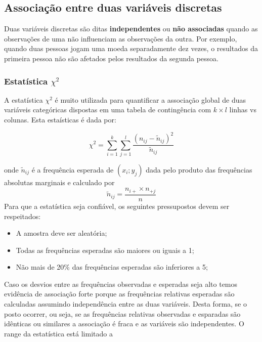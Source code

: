 \documentclass[11pt,]{style/krantz}
\providecommand{\tightlist}{%
  \setlength{\itemsep}{0pt}\setlength{\parskip}{0pt}}
\theoremstyle{definition}
\theoremstyle{definition}
\theoremstyle{definition}
\theoremstyle{remark}
\begin{document}
\hypertarget{associacao-entre-duas-variaveis-discretas}{%
\subsection{Associação entre duas variáveis discretas}\label{associacao-entre-duas-variaveis-discretas}}

Duas variáveis discretas são ditas \textbf{independentes} ou \textbf{não associadas} quando as observações de uma não influenciam as observações da outra. Por exemplo, quando duas pessoas jogam uma moeda separadamente dez vezes, o resultados da primeira pessoa não são afetados pelos resultados da segunda pessoa.

\hypertarget{estatistica-chi2}{%
\subsubsection{\texorpdfstring{Estatística \(\chi^2\)}{Estatística \textbackslash{}chi\^{}2}}\label{estatistica-chi2}}

A estatística \(\chi^2\) é muito utilizada para quantificar a associação global de duas variáveis categóricas dispostas em uma tabela de contingência com \(k \times l\) linhas vs colunas. Esta estaísticas é dada por:

\[\chi^2 = \sum_{i=1}^{k} \sum_{j=1}^{l} \frac{(n_{ij} - \widetilde{n}_{ij})^2}{\widetilde{n}_{ij}}\]

onde \(\widetilde{n}_{ij}\) é a frequência esperada de \((x_i;y_j)\) dada pelo produto das frequências absolutas marginais e calculado por
\[\widetilde{n}_{ij} = \frac{n_{i+}\times n_{+j}}{n}\]
Para que a estatística seja confiável, os seguintes pressupostos devem ser respeitados:

\begin{itemize}
\tightlist
\item
  A amostra deve ser aleatória;
\item
  Todas as frequências esperadas são maiores ou iguais a 1;
\item
  Não mais de 20\% das frequências esperadas são inferiores a 5;
\end{itemize}

Caso os desvios entre as frequências observadas e esperadas seja alto temos evidência de associação forte porque as frequências relativas esperadas são calculadas assumindo independência entre as duas variáveis. Desta forma, se o posto ocorrer, ou seja, se as frequências relativas observadas e esparadas são idênticas ou similares a associação é fraca e as variáveis são independentes. O range da estatística está limitado a
\end{document}
